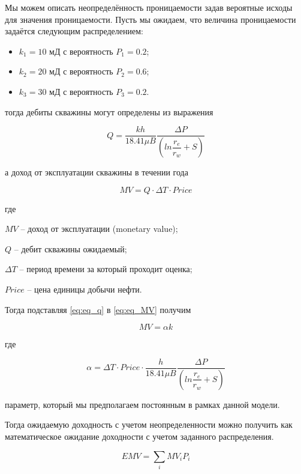 Мы  можем описать неопределённость проницаемости задав вероятные исходы для значения проницаемости. Пусть мы ожидаем, что величина проницаемости задаётся следующим распределением:
\begin{itemize}
	\item $k_1 = 10$ мД с вероятность $P_1 = 0.2$; 
	\item $k_2 = 20$ мД с вероятность $P_2 = 0.6$; 
	\item $k_3 = 30$ мД с вероятность $P_3 = 0.2$. 
\end{itemize}

тогда дебиты скважины могут определены из выражения

\begin{equation}
	Q = \frac{kh}{18.41 \mu B} \frac{\Delta P}{  \left( ln\dfrac{r_e}{r_w} + S\right) }
	\label{eq:eq_q}
\end{equation}


а доход от эксплуатации скважины в течении года 

\begin{equation}
	MV = Q \cdot  \Delta T \cdot  Price
	\label{eq:eq_MV}
\end{equation}

где 

$MV$ -- доход от эксплуатации (monetary value);

$Q$ -- дебит скважины ожидаемый;
 
$\Delta T$ -- период времени за который проходит оценка;

$Price$ -- цена единицы добычи нефти.

Тогда подставляя \eqref{eq:eq_q} в \eqref{eq:eq_MV} получим 

\begin{equation}
	MV = \alpha k
	\label{eq:eq_MV_2}
\end{equation}

где 

$$\alpha =  \Delta T \cdot  Price \cdot \frac{h}{18.41 \mu B} \frac{\Delta P}{  \left( ln\dfrac{r_e}{r_w} + S\right)}
$$ 

параметр, который мы предполагаем постоянным в рамках данной модели. 

Тогда ожидаемую доходность с учетом неопределенности можно получить как математическое ожидание доходности с учетом заданного распределения. 

\begin{equation}
	EMV = \sum_{i} MV_i P_i
	\label{eq:eq_EMV_1}
\end{equation}

